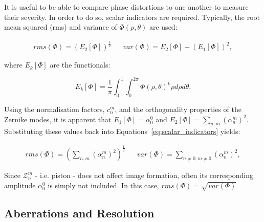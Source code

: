 It is useful to be able to compare phase distortions to one another to
measure their severity. In order to do so, scalar indicators are required.
Typically, the root mean squared (rms) and variance of $\Phi\left(\rho,\theta\right)$
are used:

\begin{align}\label{eq:scalar_indicators}
rms(\Phi) = \left(E_{2}\left[\Phi\right]\right)^{\frac{1}{2}} && 
var(\Phi) = E_{2}\left[\Phi\right] - \left(E_{1}\left[\Phi\right]\right)^{2},
\end{align}

where $E_{k}\left[\Phi\right]$ are the 
functionals\cite{antonello2014optimisation,mahajan1994zernike}:

\begin{equation}\label{eq:E_functionals}
E_{k}\left[\Phi\right] = \frac{1}{\pi} \int_{0}^{1}\int_{0}^{2\pi} \Phi\left(\rho,\theta\right)^{k}\rho d\rho d\theta.
\end{equation}

Using the normalisation factors, $c_{n}^{m}$, and the orthogonality
properties of the Zernike modes, it is apparent that $E_{1}\left[\Phi\right] 
= \alpha_{0}^{0}$ and $E_{2}\left[\Phi\right] = 
\sum\limits_{n,m}{\left({\alpha_{n}^{m}}\right)^{2}}$. Substituting 
these values back into Equations~\ref{eq:scalar_indicators} yields:

\begin{align}\label{eq:scalar_indicators_new}
rms(\Phi) = \left(\sum\limits_{n,m}{\left({\alpha_{n}^{m}}\right)^{2}}\right)^{\frac{1}{2}} && 
var(\Phi) = \sum\limits_{n\ne 0,m\ne 0}{\left({\alpha_{n}^{m}}\right)^{2}},
\end{align}

Since $\mathcal{Z}_{n}^{m}$ - i.e. piston - does not affect image 
formation, often its corresponding amplitude $\alpha_{0}^{0}$ is
simply not included. In this case, $rms(\Phi) = \sqrt{var(\Phi)}$

\subsection{Aberrations and Resolution}
\label{subsec:aberrations_and_resolution}

